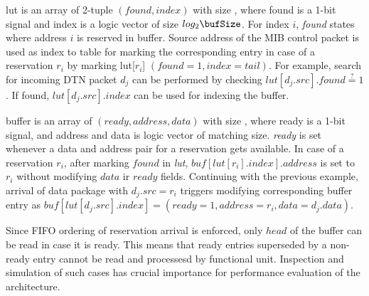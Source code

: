 	lut is an array of 2-tuple $(found, index)$ with size \nrFUS, where found is a 1-bit signal and index is a logic vector of size $log_2\bufSize$. For index $i$, \textit{found} states where address $i$ is reserved in  buffer. Source address of the MIB control packet is used as index to table for marking the corresponding entry in case of a reservation $r_i$ by marking lut[$r_i$] $(found=1,index=tail)$. For example, search for incoming DTN packet $d_j$ can be performed by checking $lut[d_j.src].found\stackrel{?}{=}1$. If found, $lut[d_j.src].index$ can be used for indexing the buffer.
	
	buffer is an array of  $(ready, address, data)$ with size \bufSize, where ready is a 1-bit signal, and address and data is logic vector of matching size. \textit{ready} is set whenever a data and address pair for a reservation gets available. In case of a reservation $r_i$, after marking $found$ in \textit{lut}, $buf[lut[r_i].index].address$ is set to $r_i$ without modifying $data$ ir $ready$ fields. Continuing with the previous example, arrival of data package with $d_j.src=r_i$ triggers modifying corresponding buffer entry as $buf[lut[d_j.src].index] = (ready=1, address= r_i, data= d_j.data)$.  
	
	Since FIFO ordering of reservation arrival is enforced, only $head$ of the buffer can be read in case it is ready. This means that ready entries superseded by a non-ready entry cannot be read and processesd by functional unit. Inspection and simulation of such cases has crucial importance for performance evaluation of the architecture.
	
	

